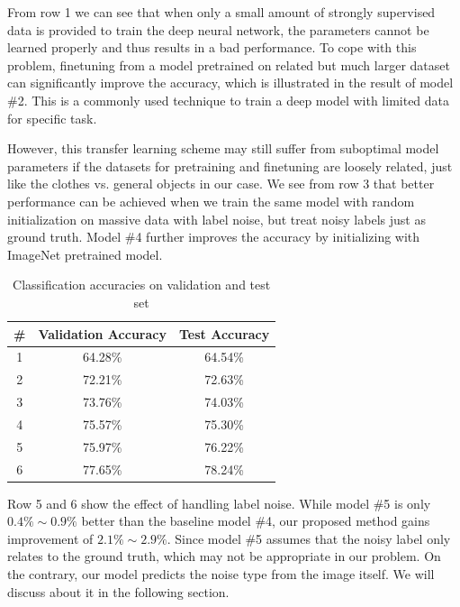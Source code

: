 \documentclass[10pt,twocolumn,letterpaper]{article}
\begin{document}
From row 1 we can see that when only a small amount of strongly supervised data is provided to train the deep neural network, the parameters cannot be learned properly and thus results in a bad performance. To cope with this problem, finetuning from a model pretrained on related but much larger dataset can significantly improve the accuracy, which is illustrated in the result of model \#2. This is a commonly used technique to train a deep model with limited data for specific task.

However, this transfer learning scheme may still suffer from suboptimal model parameters if the datasets for pretraining and finetuning are loosely related, just like the clothes vs. general objects in our case. We see from row 3 that better performance can be achieved when we train the same model with random initialization on massive data with label noise, but treat noisy labels just as ground truth. Model \#4 further improves the accuracy by initializing with ImageNet pretrained model.

\begin{table}
\begin{center}
\begin{tabular}{c|c|c}
\hline
\# & Validation Accuracy & Test Accuracy \\
\hline\hline
1 & 64.28\% & 64.54\% \\
\hline
2 & 72.21\% & 72.63\% \\
\hline
3 & 73.76\% & 74.03\% \\
\hline
4 & 75.57\% & 75.30\% \\
\hline
5 & 75.97\% & 76.22\% \\
\hline
6 & 77.65\% & 78.24\% \\
\hline
\end{tabular}
\end{center}
\caption{Classification accuracies on validation and test set}
\label{tab:accuracy}
\end{table}


Row 5 and 6 show the effect of handling label noise. While model \#5 is only $0.4\% \sim 0.9\%$ better than the baseline model \#4, our proposed method gains improvement of $2.1\% \sim 2.9\%$. Since model \#5 assumes that the noisy label only relates to the ground truth, which may not be appropriate in our problem. On the contrary, our model predicts the noise type from the image itself. We will discuss about it in the following section.
\end{document}
